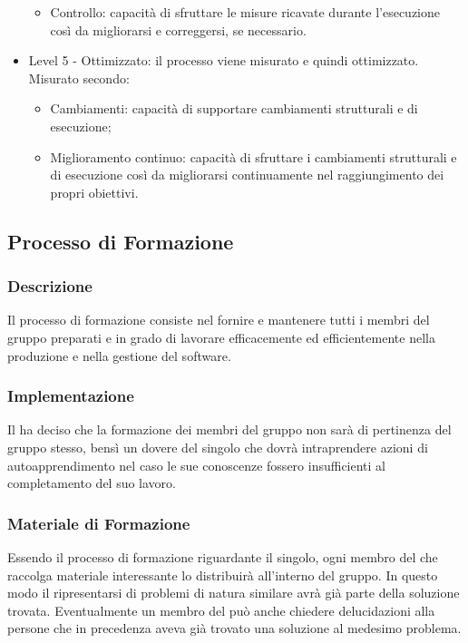 \begin{itemize}
\begin{itemize}
					\item Controllo: capacità di sfruttare le misure ricavate durante l'esecuzione così da migliorarsi e correggersi, se necessario.
				\end{itemize}
			\item Level 5 - Ottimizzato: il processo viene misurato e quindi ottimizzato.
			Misurato secondo:
				\begin{itemize}
					\item Cambiamenti: capacità di supportare cambiamenti strutturali e di esecuzione;
					\item Miglioramento continuo: capacità di sfruttare i cambiamenti strutturali e di esecuzione così da migliorarsi continuamente nel raggiungimento dei propri obiettivi.
				\end{itemize}
			\end{itemize}

\subsection{Processo di Formazione}
\subsubsection{Descrizione}
Il processo di formazione consiste nel fornire e mantenere tutti i membri del gruppo preparati e in grado di lavorare efficacemente ed efficientemente nella produzione e nella gestione del software.

\subsubsection{Implementazione}
Il  ha deciso che la formazione dei membri del gruppo non sarà di pertinenza del gruppo stesso, bensì un dovere del singolo che dovrà intraprendere azioni di autoapprendimento nel caso le sue conoscenze fossero insufficienti al completamento del suo lavoro.

\subsubsection{Materiale di Formazione}
Essendo il processo di formazione riguardante il singolo, ogni membro del  che raccolga materiale interessante lo distribuirà all'interno del gruppo. In questo modo il ripresentarsi di problemi di natura similare avrà già parte della soluzione trovata. Eventualmente un membro del  può anche chiedere delucidazioni alla persone che in precedenza aveva già trovato una soluzione al medesimo problema.


